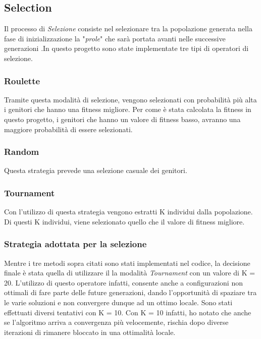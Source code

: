 \documentclass{article}
\begin{document}
\begin{enumerate}
\subsection{Selection}
Il processo di \textit{Selezione} consiste nel selezionare tra la popolazione generata nella fase di inizializzazione la "\textit{prole}" che sarà portata avanti nelle successive generazioni .In questo progetto sono state implementate tre tipi di operatori di selezione.

\subsubsection{Roulette}

Tramite questa modalità di selezione, vengono selezionati con probabilità più alta i genitori che hanno una fitness migliore. Per come è stata calcolata la fitness in questo progetto, i genitori che hanno un valore di fitness basso, avranno una maggiore probabilità di essere selezionati.

\subsubsection{Random}
Questa strategia prevede una selezione casuale dei genitori. 

\subsubsection{Tournament}
Con l'utilizzo di questa strategia vengono estratti K individui dalla popolazione. Di questi K individui, viene selezionato quello che il valore di fitness migliore.

\subsubsection{Strategia adottata per la selezione}
Mentre i tre metodi sopra citati sono stati implementati nel codice, la decisione finale è stata quella di utilizzare il la modalità \textit{Tournament} con un valore di K = 20. L'utilizzo di questo operatore infatti, consente anche a configurazioni non ottimali di fare parte delle future generazioni, dando l'opportunità di spaziare tra le varie soluzioni e non convergere dunque ad un ottimo locale. Sono stati effettuati diversi tentativi con K = 10. Con K = 10 infatti, ho notato che anche se l'algoritmo arriva a convergenza più velocemente, rischia dopo diverse iterazioni di rimanere bloccato in una ottimalità locale.


\end{enumerate}
\end{document}
